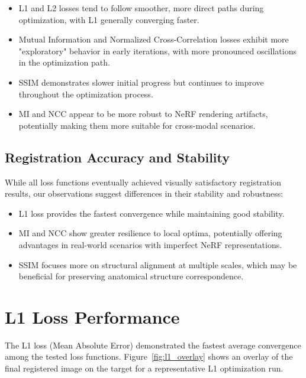 \begin{itemize}
    \item L1 and L2 losses tend to follow smoother, more direct paths during optimization, with L1 generally converging faster.
    
    \item Mutual Information and Normalized Cross-Correlation losses exhibit more "exploratory" behavior in early iterations, with more pronounced oscillations in the optimization path.
    
    \item SSIM demonstrates slower initial progress but continues to improve throughout the optimization process.
    
    \item MI and NCC appear to be more robust to NeRF rendering artifacts, potentially making them more suitable for cross-modal scenarios.
\end{itemize}

\subsection{Registration Accuracy and Stability}

While all loss functions eventually achieved visually satisfactory registration results, our observations suggest differences in their stability and robustness:

\begin{itemize}
    \item L1 loss provides the fastest convergence while maintaining good stability.
    
    \item MI and NCC show greater resilience to local optima, potentially offering advantages in real-world scenarios with imperfect NeRF representations.
    
    \item SSIM focuses more on structural alignment at multiple scales, which may be beneficial for preserving anatomical structure correspondence.
\end{itemize}

\section{L1 Loss Performance}

The L1 loss (Mean Absolute Error) demonstrated the fastest average convergence among the tested loss functions. Figure~\ref{fig:l1_overlay} shows an overlay of the final registered image on the target for a representative L1 optimization run.

